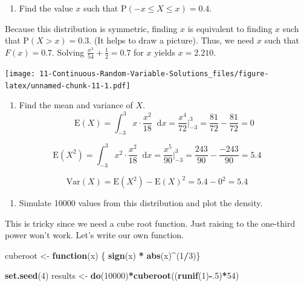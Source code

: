 \documentclass[
]{book}
\newenvironment{Shaded}{\begin{snugshade}}{\end{snugshade}}
\newcommand{\ControlFlowTok}[1]{\textcolor[rgb]{0.13,0.29,0.53}{\textbf{#1}}}
\newcommand{\DecValTok}[1]{\textcolor[rgb]{0.00,0.00,0.81}{#1}}
\newcommand{\KeywordTok}[1]{\textcolor[rgb]{0.13,0.29,0.53}{\textbf{#1}}}
\newcommand{\NormalTok}[1]{#1}
\newcommand{\OperatorTok}[1]{\textcolor[rgb]{0.81,0.36,0.00}{\textbf{#1}}}
\newcommand{\StringTok}[1]{\textcolor[rgb]{0.31,0.60,0.02}{#1}}
\providecommand{\tightlist}{%
  \setlength{\itemsep}{0pt}\setlength{\parskip}{0pt}}
\begin{document}
\begin{enumerate}
\def\labelenumi{\alph{enumi}.}
\setcounter{enumi}{6}
\tightlist
\item
  Find the value \(x\) such that \(\mbox{P}(-x \leq X \leq x)=0.4\).
\end{enumerate}

Because this distribution is symmetric, finding \(x\) is equivalent to finding \(x\) such that \(\mbox{P}(X>x)=0.3\). (It helps to draw a picture). Thus, we need \(x\) such that \(F(x)=0.7\). Solving \(\frac{x^3}{54}+\frac{1}{2}=0.7\) for \(x\) yields \(x=2.210\).

\texttt{[image: 11-Continuous-Random-Variable-Solutions\_files/figure-latex/unnamed-chunk-11-1.pdf]}

\begin{enumerate}
\def\labelenumi{\alph{enumi}.}
\setcounter{enumi}{7}
\tightlist
\item
  Find the mean and variance of \(X\).
  \[
  \mbox{E}(X)=\int_{-3}^3 x\cdot\frac{x^2}{18}\mathop{}\!\mathrm{d}x = \frac{x^4}{72}\bigg|_{-3}^3=\frac{81}{72}-\frac{81}{72} = 0
  \]
\end{enumerate}

\[
\mbox{E}(X^2)=\int_{-3}^3 x^2\cdot\frac{x^2}{18}\mathop{}\!\mathrm{d}x = \frac{x^5}{90}\bigg|_{-3}^3=\frac{243}{90}-\frac{-243}{90} = 5.4
\]

\[
\mbox{Var}(X)=\mbox{E}(X^2)-\mbox{E}(X)^2=5.4-0^2=5.4
\]

\begin{enumerate}
\def\labelenumi{\roman{enumi}.}
\tightlist
\item
  Simulate 10000 values from this distribution and plot the density.
\end{enumerate}

This is tricky since we need a cube root function. Just raising to the one-third power won't work. Let's write our own function.

\begin{Shaded}
\begin{Highlighting}[]
\NormalTok{cuberoot <-}\StringTok{ }\ControlFlowTok{function}\NormalTok{(x) \{}
  \KeywordTok{sign}\NormalTok{(x) }\OperatorTok{*}\StringTok{ }\KeywordTok{abs}\NormalTok{(x)}\OperatorTok{^}\NormalTok{(}\DecValTok{1}\OperatorTok{/}\DecValTok{3}\NormalTok{)\}}
\end{Highlighting}
\end{Shaded}

\begin{Shaded}
\begin{Highlighting}[]
\KeywordTok{set.seed}\NormalTok{(}\DecValTok{4}\NormalTok{)}
\NormalTok{results <-}\StringTok{ }\KeywordTok{do}\NormalTok{(}\DecValTok{10000}\NormalTok{)}\OperatorTok{*}\KeywordTok{cuberoot}\NormalTok{((}\KeywordTok{runif}\NormalTok{(}\DecValTok{1}\NormalTok{)}\OperatorTok{-}\NormalTok{.}\DecValTok{5}\NormalTok{)}\OperatorTok{*}\DecValTok{54}\NormalTok{)}
\end{Highlighting}
\end{Shaded}
\end{document}
